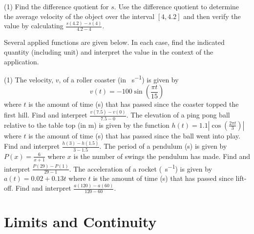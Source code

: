 \documentclass[12pt,]{book}
\theoremstyle{plain}
\theoremstyle{definition}
\theoremstyle{definition}
\theoremstyle{definition}
\theoremstyle{definition}
\theoremstyle{definition}
\numberwithin{equation}{section}
\newcommand{\fe}[2]{#1\mathopen{}\left(#2\right)\mathclose{}}
\newcommand{\cinterval}[2]{\left[#1,#2\right]}
\newcommand{\abs}[1]{\left|#1\right|}
\begin{document}
\begin{exercisegroup}(1)
\exercise[11.]\hypertarget{exercise-40}{}Find the difference quotient for \(s\).%
\exercise[12.]\hypertarget{exercise-41}{}Use the difference quotient to determine the average velocity of the object over the interval \(\cinterval{4}{4.2}\) and then verify the value by calculating \(\frac{\fe{s}{4.2}-\fe{s}{4}}{4.2-4}\).%
\end{exercisegroup}
\par\smallskip\noindent
\hypertarget{exercisegroup-12}{}\par\noindent Several applied functions are given below.  In each case, find the indicated quantity (including unit) and interpret the value in the context of the application.%
\begin{exercisegroup}(1)
\exercise[13.]\hypertarget{exercise-42}{}The velocity, \(v\), of a roller coaster (in \si{\foot\per\second}) is given by \begin{equation*}\fe{v}{t}=-100\fe{\sin}{\frac{\pi t}{15}}\end{equation*} where \(t\) is the amount of time (\si{\second}) that has passed since the coaster topped the first hill.  Find and interpret \(\frac{\fe{v}{7.5}-\fe{v}{0}}{7.5-0}\).%
\exercise[14.]\hypertarget{exercise-43}{}The elevation of a ping pong ball relative to the table top (in \si{\meter}) is given by the function \(\fe{h}{t}=1.1\abs{\fe{\cos}{\frac{2\pi t}{3}}}\) where \(t\) is the amount of time (\si{\second}) that has passed since the ball went into play.  Find and interpret \(\frac{\fe{h}{3}-\fe{h}{1.5}}{3-1.5}\).%
\exercise[15.]\hypertarget{exercise-44}{}The period of a pendulum (\si{\second}) is given by \(\fe{P}{x}=\frac{6}{x+1}\) where \(x\) is the number of swings the pendulum has made.  Find and interpret \(\frac{\fe{P}{29}-\fe{P}{1}}{29-1}\).%
\exercise[16.]\hypertarget{exercise-45}{}The acceleration of a rocket (\si{\mileperhour\per\second}) is given by \(\fe{a}{t}=0.02+0.13t\) where \(t\) is the amount of time (\si{\second}) that has passed since lift-off.  Find and interpret \(\frac{\fe{a}{120}-\fe{a}{60}}{120-60}\).%
\end{exercisegroup}
\par\smallskip\noindent
\typeout{************************************************}
\typeout{************************************************}
\chapter[{Limits and Continuity}]{Limits and Continuity}\label{chapter-limits}
\typeout{************************************************}
\typeout{************************************************}
\end{document}
